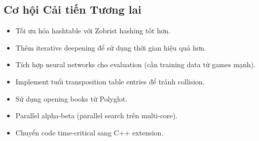 \subsection{Cơ hội Cải tiến Tương lai}
\begin{itemize}
    \item Tối ưu hóa hashtable với Zobrist hashing tốt hơn.
    \item Thêm iterative deepening để sử dụng thời gian hiệu quả hơn.
    \item Tích hợp neural networks cho evaluation (cần training data từ games mạnh).
    \item Implement tuổi transposition table entries để tránh collision.
    \item Sử dụng opening books từ Polyglot.
    \item Parallel alpha-beta (parallel search trên multi-core).
    \item Chuyển code time-critical sang C++ extension.
\end{itemize}

